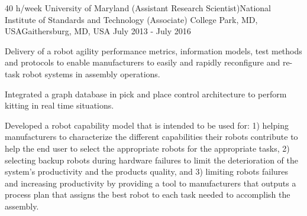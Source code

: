 \begin{cventries}
\cventry
{40 h/week} %
{University of Maryland (Assistant Research Scientist)\newline National Institute of Standards and Technology (Associate)} %
{College Park, MD, USA\newline Gaithersburg, MD, USA} %
{July 2013 - July 2016} %
{ %
\begin{cvitems}
\item {Delivery of a robot agility performance metrics, information models, test methods and protocols to enable manufacturers to easily and rapidly reconfigure and re-task robot systems in assembly operations.}
    \begin{cvitems2}
    \item Integrated  a graph database in pick and place control architecture to perform kitting in real time situations.
    \item {Developed a robot capability model that is intended to be used for: 1) helping manufacturers to characterize the different capabilities their robots contribute to help the end user to select the appropriate robots for the appropriate tasks, 2) selecting backup robots during hardware failures to limit the deterioration of the system’s productivity and the products quality, and 3) limiting robots failures and increasing productivity by providing a tool to manufacturers that outputs a process plan that assigns the best robot to each task needed to accomplish the assembly.}
    \end{cvitems2}
\end{cvitems}
}


\end{cventries}
